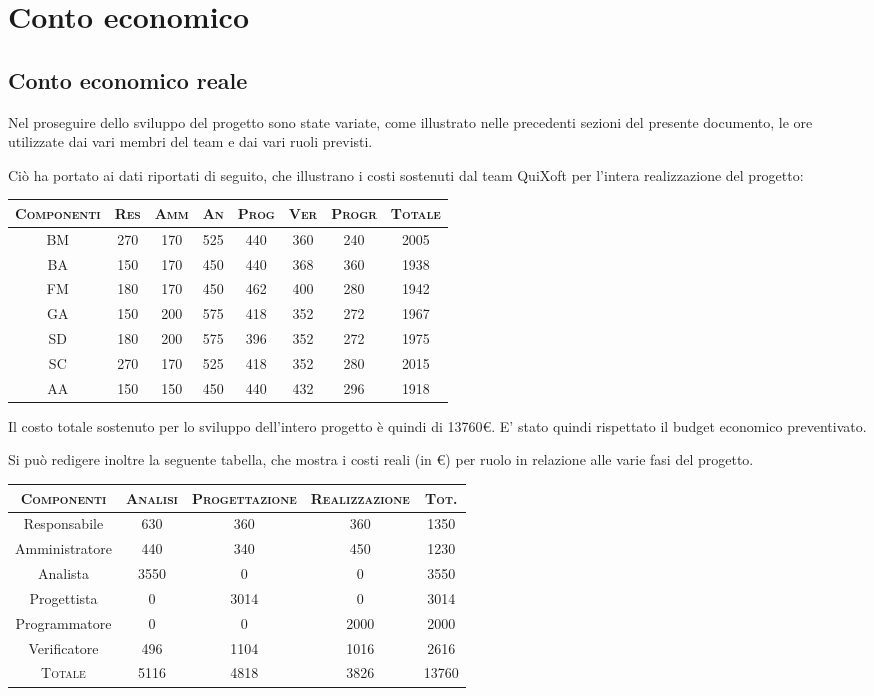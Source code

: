 \documentclass[11pt,a4paper]{article}
\begin{document}
\section{Conto economico}
\subsection{Conto economico reale}
Nel proseguire dello sviluppo del progetto sono state variate, come illustrato nelle precedenti sezioni del presente documento, le ore utilizzate dai vari membri del team e dai vari ruoli previsti.

Ciò ha portato ai dati riportati di seguito, che illustrano i costi sostenuti dal team QuiXoft per l'intera realizzazione del progetto:
\\
\begin{center}
\begin{tabular}{|c||c|c|c|c|c|c||c|}
\hline
\textsc{Componenti} & \textsc{Res} & \textsc{Amm} & \textsc{An} & \textsc{Prog} & \textsc{Ver} & \textsc{Progr} & \textsc{Totale}\\
\hline \hline
BM & 270 & 170 & 525 & 440 & 360 & 240 & 2005 \\ \hline
BA & 150 & 170 & 450 & 440 & 368 & 360 & 1938 \\ \hline
FM & 180 & 170 & 450 & 462 & 400 & 280 & 1942 \\ \hline
GA & 150 & 200 & 575 & 418 & 352 & 272 & 1967  \\ \hline
SD & 180 & 200 & 575 & 396 & 352 & 272 & 1975 \\ \hline
SC & 270 & 170 & 525 & 418 & 352 & 280 & 2015 \\ \hline
AA & 150 & 150 & 450 & 440 & 432 & 296 & 1918 \\ \hline
\end{tabular}
\end{center}
\bigskip
Il costo totale sostenuto per lo sviluppo dell'intero progetto è quindi di 13760\euro. E' stato quindi rispettato il budget economico preventivato.

Si può redigere inoltre la seguente tabella, che mostra i costi reali (in \euro) per ruolo in relazione alle varie fasi del progetto.
\begin{center}
\begin{tabular}{|c||c|c|c||c|}
\hline
\textsc{Componenti}& \textsc{Analisi} & \textsc{Progettazione} & \textsc{Realizzazione} & \textsc{Tot.} \\ \hline \hline
Responsabile & 630 & 360 & 360 & 1350 \\ \hline
Amministratore & 440 & 340 & 450 & 1230 \\ \hline
Analista & 3550 & 0 & 0 & 3550 \\ \hline
Progettista & 0 & 3014 & 0 & 3014 \\ \hline
Programmatore & 0 & 0 & 2000 & 2000 \\ \hline
Verificatore & 496 & 1104 & 1016 & 2616 \\ \hline \hline
\textsc{Totale} & 5116 & 4818 & 3826 & 13760 \\ \hline
\end{tabular}
\end{center}
\newpage
\end{document}
